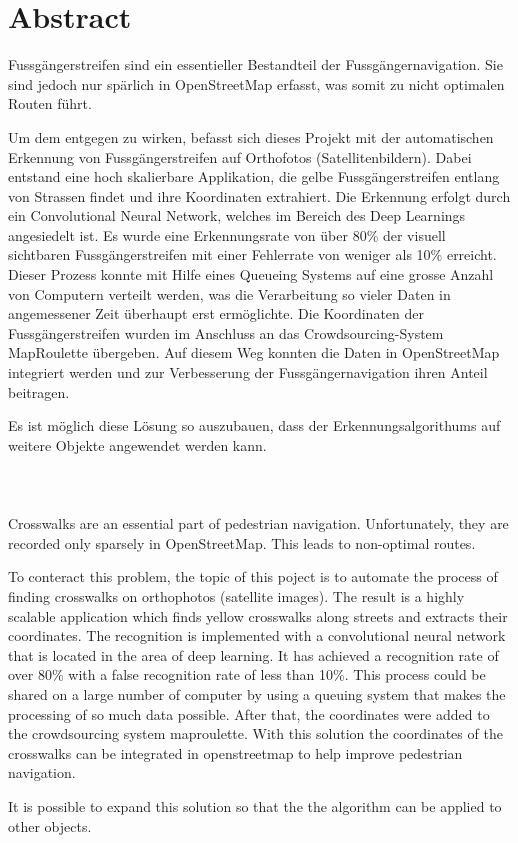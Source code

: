 \section{Abstract}

Fussgängerstreifen sind ein essentieller Bestandteil der Fussgängernavigation. Sie sind jedoch nur spärlich in OpenStreetMap erfasst, was somit zu nicht optimalen Routen führt.

Um dem entgegen zu wirken,  befasst sich dieses Projekt mit der automatischen Erkennung von Fussgängerstreifen auf Orthofotos (Satellitenbildern). 
Dabei entstand eine hoch skalierbare Applikation, die gelbe Fussgängerstreifen entlang von Strassen findet und ihre Koordinaten extrahiert. Die Erkennung erfolgt durch ein Convolutional Neural Network, welches im Bereich des Deep Learnings angesiedelt ist.
Es wurde eine Erkennungsrate von über 80\% der visuell sichtbaren Fussgängerstreifen mit einer Fehlerrate von weniger als 10\% erreicht. Dieser Prozess konnte mit Hilfe eines Queueing Systems auf eine grosse Anzahl von Computern verteilt werden, was die Verarbeitung so vieler Daten in angemessener Zeit überhaupt erst ermöglichte. Die Koordinaten der Fussgängerstreifen wurden im Anschluss an das Crowdsourcing-System MapRoulette übergeben. Auf diesem Weg konnten die Daten in OpenStreetMap integriert werden und zur Verbesserung der Fussgängernavigation ihren Anteil beitragen.

Es ist möglich diese Lösung so auszubauen, dass der Erkennungsalgorithums auf weitere Objekte angewendet werden kann.\\ \\ \\ \\




Crosswalks are an essential part of pedestrian navigation. Unfortunately, they are recorded only sparsely in OpenStreetMap. This leads to non-optimal routes.

To conteract this problem, the topic of this poject is to automate the process of finding crosswalks on orthophotos (satellite images). The result is a highly scalable application which finds yellow crosswalks along streets and extracts their coordinates. The recognition is implemented with a convolutional neural network that is located in the area of deep learning. It has achieved a recognition rate of over 80\% with a false recognition rate of less than 10\%. This process could be shared on a large number of computer by using a queuing system that makes the processing of so much data possible. After that, the coordinates were added to the crowdsourcing system maproulette. With this solution the coordinates of the crosswalks can be integrated in openstreetmap to help improve pedestrian navigation.

It is possible to expand this solution so that the the algorithm can be applied to other objects.

